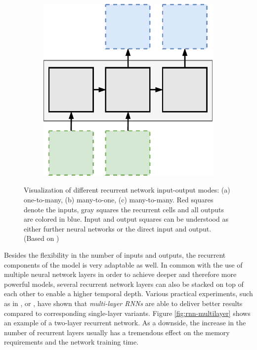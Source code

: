 \begin{figure}[htpb]
\begin{subfigure}{0.3\textwidth}
  \centering
  \includegraphics[width=.8\linewidth]{figures/many2many.pdf}
  \caption{}
  \label{fig:rnn-many2many}
\end{subfigure}
\caption[Examples of RNN Input-Output Modes]{Visualization of different recurrent network input-output modes: (a) one-to-many, (b) many-to-one, (c) many-to-many. Red squares denote the inputs, gray squares the recurrent cells and all outputs are colored in blue. Input and output squares can be understood as either further neural networks or the direct input and output. (Based on \parencite{rnn-effectiveness})}
\label{fig:rnn-modes}
\end{figure}

Besides the flexibility in the number of inputs and outputs, the recurrent components of the model is very adaptable as well. In common with the use of multiple neural network layers in order to achieve deeper and therefore more powerful models, several recurrent network layers can also be stacked on top of each other to enable a higher temporal depth. Various practical experiments, such as in \parencite{beyond_snippets_video_class}, \parencite{conv_lstm_nowcasting} or \parencite{unsup_learn_lstm}, have shown that \textit{multi-layer RNNs} are able to deliver better results compared to corresponding single-layer variants. Figure \ref{fig:rnn-multilayer} shows an example of a two-layer recurrent network. As a downside, the increase in the number of recurrent layers usually has a tremendous effect on the memory requirements and the network training time.


